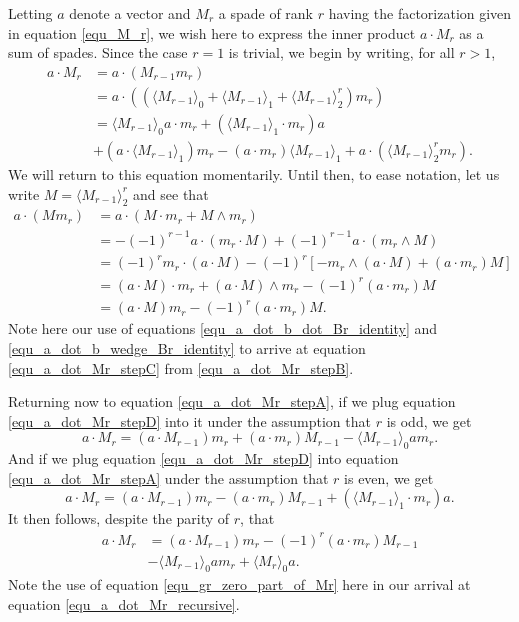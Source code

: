 \documentclass{birkjour}
\theoremstyle{definition}
\theoremstyle{remark}
\numberwithin{equation}{section}
\begin{document}
Letting $a$ denote a vector and $M_r$ a spade of rank $r$ having the factorization
given in equation \eqref{equ_M_r},
we wish here to express the inner product $a\cdot M_r$ as a sum of spades.
Since the case $r=1$ is trivial, we begin by writing, for all $r>1$,
\begin{align}
a\cdot M_r &= a\cdot (M_{r-1}m_r)\nonumber \\
 &= a\cdot((\langle M_{r-1}\rangle_0 + \langle M_{r-1}\rangle_1 + \langle M_{r-1}\rangle_2^r)m_r)\nonumber \\
 &= \langle M_{r-1}\rangle_0a\cdot m_r + (\langle M_{r-1}\rangle_1\cdot m_r)a\nonumber \\
 &+ (a\cdot\langle M_{r-1}\rangle_1)m_r - (a\cdot m_r)\langle M_{r-1}\rangle_1 + a\cdot(\langle M_{r-1}\rangle_2^rm_r).\label{equ_a_dot_Mr_stepA}
\end{align}
We will return to this equation momentarily.  Until then, to ease notation, let us write $M=\langle M_{r-1}\rangle_2^r$ and see that
\begin{align}
a\cdot(Mm_r)
 &= a\cdot(M\cdot m_r + M\wedge m_r)\nonumber \\
 &= -(-1)^{r-1}a\cdot(m_r\cdot M) + (-1)^{r-1}a\cdot(m_r\wedge M)\label{equ_a_dot_Mr_stepB} \\
 &= (-1)^rm_r\cdot(a\cdot M) - (-1)^r\left[-m_r\wedge(a\cdot M)+(a\cdot m_r)M\right]\label{equ_a_dot_Mr_stepC} \\
 &= (a\cdot M)\cdot m_r + (a\cdot M)\wedge m_r - (-1)^r(a\cdot m_r)M\nonumber \\
 &= (a\cdot M)m_r - (-1)^r(a\cdot m_r)M.\label{equ_a_dot_Mr_stepD}
\end{align}
Note here our use of equations \eqref{equ_a_dot_b_dot_Br_identity} and \eqref{equ_a_dot_b_wedge_Br_identity} to
arrive at equation \eqref{equ_a_dot_Mr_stepC} from \eqref{equ_a_dot_Mr_stepB}.

Returning now to equation \eqref{equ_a_dot_Mr_stepA}, if we plug equation \eqref{equ_a_dot_Mr_stepD} into it
under the assumption that $r$ is odd, we get
\begin{equation}
a\cdot M_r = (a\cdot M_{r-1})m_r + (a\cdot m_r)M_{r-1} - \langle M_{r-1}\rangle_0am_r.
\end{equation}
And if we plug equation \eqref{equ_a_dot_Mr_stepD} into equation \eqref{equ_a_dot_Mr_stepA} under the assumption
that $r$ is even, we get
\begin{equation}
a\cdot M_r = (a\cdot M_{r-1})m_r - (a\cdot m_r)M_{r-1} + (\langle M_{r-1}\rangle_1\cdot m_r)a.
\end{equation}
It then follows, despite the parity of $r$, that
\begin{align}
a\cdot M_r &= (a\cdot M_{r-1})m_r - (-1)^r(a\cdot m_r)M_{r-1}\nonumber \\
 &- \langle M_{r-1}\rangle_0am_r + \langle M_r\rangle_0a.\label{equ_a_dot_Mr_recursive}
\end{align}
Note the use of equation \eqref{equ_gr_zero_part_of_Mr} here in our arrival at equation \eqref{equ_a_dot_Mr_recursive}.
\end{document}
